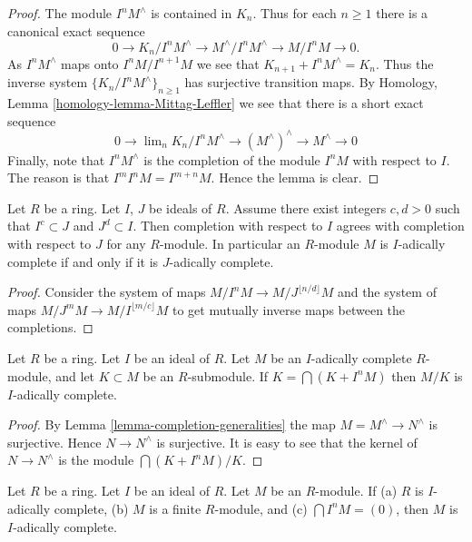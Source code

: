 \begin{proof}
The module $I^n M^\wedge$ is contained in $K_n$.
Thus for each $n \geq 1$ there is a canonical exact sequence
$$
0 \to K_n/I^nM^\wedge \to M^\wedge/I^nM^\wedge \to M/I^nM \to 0.
$$
As $I^nM^\wedge$ maps onto $I^nM/I^{n + 1}M$ we see that
$K_{n + 1} + I^n M^\wedge = K_n$. Thus the inverse system
$\{K_n/I^n M^\wedge\}_{n \geq 1}$ has surjective transition maps.
By Homology, Lemma \ref{homology-lemma-Mittag-Leffler} we see that
there is a short exact sequence
$$
0 \to
\lim\nolimits_n K_n/I^n M^\wedge \to
(M^\wedge)^\wedge \to
M^\wedge \to 0
$$
Finally, note that $I^nM^\wedge$ is the completion of
the module $I^nM$ with respect to $I$. The reason is that
$I^m I^n M = I^{m + n}M$. Hence the lemma is clear.
\end{proof}

\begin{lemma}
\label{lemma-change-ideal-completion}
Let $R$ be a ring.
Let $I$, $J$ be ideals of $R$.
Assume there exist integers $c, d > 0$ such that
$I^c \subset J$ and $J^d \subset I$.
Then completion with respect to $I$ agrees with completion
with respect to $J$ for any $R$-module.
In particular an $R$-module $M$ is $I$-adically complete
if and only if it is $J$-adically complete.
\end{lemma}

\begin{proof}
Consider the system of maps
$M/I^nM \to M/J^{\lfloor n/d \rfloor}M$ and
the system of maps $M/J^mM \to M/I^{\lfloor m/c \rfloor}M$
to get mutually inverse maps between the completions.
\end{proof}


\begin{lemma}
\label{lemma-quotient-complete}
Let $R$ be a ring. Let $I$ be an ideal of $R$.
Let $M$ be an $I$-adically complete $R$-module,
and let $K \subset M$ be an $R$-submodule.
If $K = \bigcap (K + I^nM)$ then $M/K$ is $I$-adically complete.
\end{lemma}

\begin{proof}
By Lemma \ref{lemma-completion-generalities}
the map $M = M^\wedge \to N^\wedge$ is surjective.
Hence $N \to N^\wedge$ is surjective. It is easy to see that the
kernel of $N \to N^\wedge$ is the module $\bigcap (K + I^nM) / K$.
\end{proof}

\begin{lemma}
\label{lemma-when-finite-module-complete-over-complete-ring}
Let $R$ be a ring. Let $I$ be an ideal of $R$.
Let $M$ be an $R$-module.
If (a) $R$ is $I$-adically complete, (b) $M$ is a finite $R$-module,
and (c) $\bigcap I^nM = (0)$, then $M$ is $I$-adically complete.
\end{lemma}

